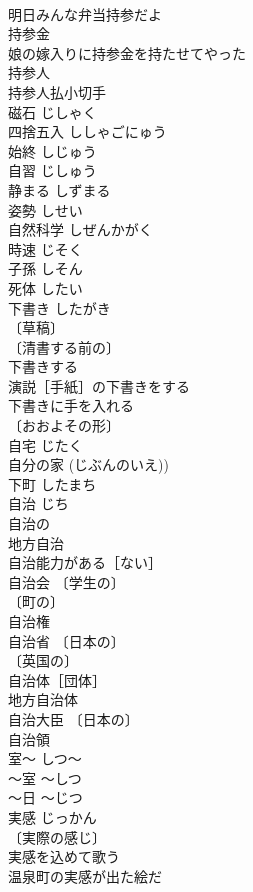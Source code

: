 \documentclass[8pt]{extreport}
\begin{document}
\begin{CJK}{UTF8}{min}
\\	明日みんな弁当持参だよ 
\\	持参金 
\\	娘の嫁入りに持参金を持たせてやった 
\\	持参人 
\\	持参人払小切手 
\\	磁石	じしゃく	
\\	四捨五入	ししゃごにゅう	
\\	始終	しじゅう	
\\	自習	じしゅう	
\\	静まる	しずまる	
\\	姿勢	しせい	
\\	自然科学	しぜんかがく	
\\	時速	じそく	
\\	子孫	しそん	
\\	死体	したい	
\\	下書き	したがき	
\\	〔草稿〕
\\	〔清書する前の〕
\\	下書きする 
\\	演説［手紙］の下書きをする 
\\	下書きに手を入れる 
\\	〔おおよその形〕
\\	自宅	じたく	
\\	自分の家 (じぶんのいえ))
\\	下町	したまち	
\\	自治	じち	
\\	自治の 
\\	地方自治 
\\	自治能力がある［ない］ 
\\	自治会 〔学生の〕
\\	〔町の〕
\\	自治権 
\\	自治省 〔日本の〕
\\	〔英国の〕
\\	自治体［団体］ 
\\	地方自治体 
\\	自治大臣 〔日本の〕
\\	自治領 
\\	室～	しつ～	
\\	～室	～しつ	
\\	～日	～じつ	
\\	実感	じっかん	
\\	〔実際の感じ〕
\\	実感を込めて歌う 
\\	温泉町の実感が出た絵だ 

\end{CJK}
\end{document}
